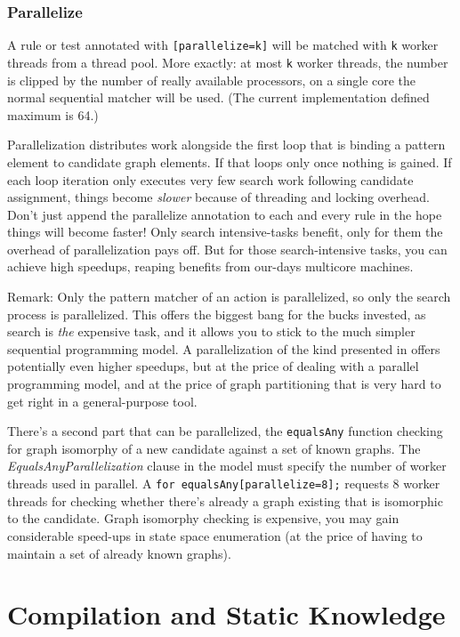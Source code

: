 \subsubsection*{Parallelize}
A rule or test annotated with \texttt{[parallelize=k]} will be matched with \texttt{k} worker threads from a thread pool.
More exactly: at most \texttt{k} worker threads, the number is clipped by the number of really available processors, on a single core the normal sequential matcher will be used.
(The current implementation defined maximum is 64.)

Parallelization distributes work alongside the first loop that is binding a pattern element to candidate graph elements.
If that loops only once nothing is gained.
If each loop iteration only executes very few search work following candidate assignment,
things become \emph{slower} because of threading and locking overhead.
Don't just append the parallelize annotation to each and every rule in the hope things will become faster!
Only search intensive-tasks benefit, only for them the overhead of parallelization pays off.
But for those search-intensive tasks, you can achieve high speedups, reaping benefits from our-days multicore machines. 

Remark: Only the pattern matcher of an action is parallelized, so only the search process is parallelized.
This offers the biggest bang for the bucks invested, as search is \emph{the} expensive task, and it allows you to stick to the much simpler sequential programming model.
A parallelization of the kind presented in \cite{ParGraErs} offers potentially even higher speedups, but at the price of dealing with a parallel programming model, and at the price of graph partitioning that is very hard to get right in a general-purpose tool.

There's a second part that can be parallelized, the \texttt{equalsAny} function checking for graph isomorphy of a new candidate against a set of known graphs.
The \emph{EqualsAnyParallelization} clause in the model must specify the number of worker threads used in parallel.
A \verb#for equalsAny[parallelize=8];# requests 8 worker threads for checking whether there's already a graph existing that is isomorphic to the candidate.
Graph isomorphy checking is expensive, you may gain considerable speed-ups in state space enumeration (at the price of having to maintain a set of already known graphs).

\section{Compilation and Static Knowledge}

